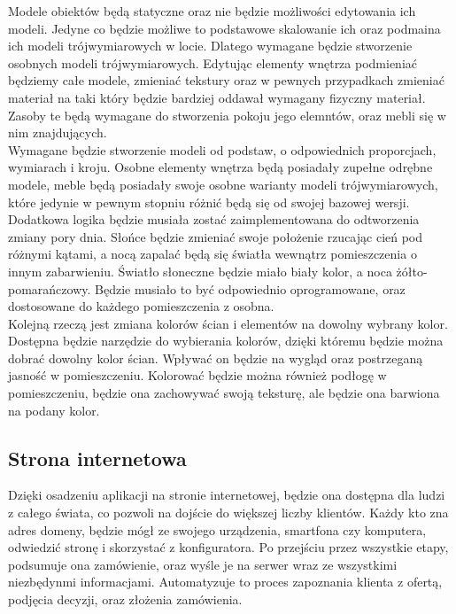 \documentclass{article} %
\begin{document}
        Modele obiektów będą statyczne oraz nie będzie możliwości edytowania ich modeli. Jedyne co będzie możliwe to podstawowe skalowanie ich oraz podmaina ich modeli trójwymiarowych w locie. Dlatego wymagane będzie stworzenie osobnych modeli trójwymiarowych. Edytując elementy wnętrza podmieniać będziemy całe modele, zmieniać tekstury oraz w pewnych przypadkach zmieniać materiał na taki który będzie bardziej oddawał wymagany fizyczny materiał. Zasoby te będą wymagane do stworzenia pokoju jego elemntów, oraz mebli się w nim znajdujących.
        \\
        
        Wymagane będzie stworzenie modeli od podstaw, o odpowiednich proporcjach, wymiarach i kroju. Osobne elementy wnętrza będą posiadały zupełne odrębne modele, meble będą posiadały swoje osobne warianty modeli trójwymiarowych, które jedynie w pewnym stopniu różnić będą się od swojej bazowej wersji.
        \\
        
        Dodatkowa logika będzie musiała zostać zaimplementowana do odtworzenia zmiany pory dnia. Słońce będzie zmieniać swoje położenie rzucając cień pod różnymi kątami, a nocą zapalać będą się światła wewnątrz pomieszczenia o innym zabarwieniu. Światło słoneczne będzie miało biały kolor, a noca żółto-pomarańczowy. Będzie musiało to być odpowiednio oprogramowane, oraz dostosowane do każdego pomieszczenia z osobna.
        \\
        
        Kolejną rzeczą jest zmiana kolorów ścian i elementów na dowolny wybrany kolor. Dostępna będzie narzędzie do wybierania kolorów, dzięki któremu będzie można dobrać dowolny kolor ścian. Wpływać on będzie na wygląd oraz postrzeganą jasność w pomieszczeniu. Kolorować będzie można również podłogę w pomieszczeniu, będzie ona zachowywać swoją teksturę, ale będzie ona barwiona na podany kolor.
        \\
        
    \subsection{Strona internetowa}
        Dzięki osadzeniu aplikacji na stronie internetowej, będzie ona dostępna dla ludzi z całego świata, co pozwoli na dojście do większej liczby klientów. Każdy kto zna adres domeny, będzie mógł ze swojego urządzenia, smartfona czy komputera, odwiedzić stronę i skorzystać z konfiguratora. Po przejściu przez wszystkie etapy, podsumuje ona zamówienie, oraz wyśle je na serwer wraz ze wszystkimi niezbędynmi informacjami. Automatyzuje to proces zapoznania klienta z ofertą, podjęcia decyzji, oraz złożenia zamówienia.
        \\
        
\end{document}

